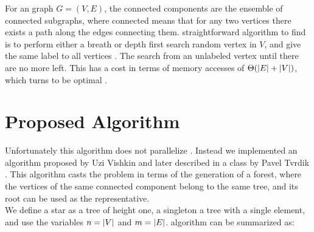 %

For an  graph $G=(V,E)$, the connected components are the ensemble
of connected subgraphs, where connected means that for any two vertices there exists a path along the edges connecting them.
 straightforward algorithm to find  is to perform either a breath or depth first search  random vertex in $V$, and give the same label to all  vertices .  The search  from an unlabeled vertex
until there are no more  left.
This has a cost in terms of memory accesses of $\Theta(\left| E \right| + \left| V \right|)$, which turns  to be optimal \cite{Hopcroft}.

\section{Proposed Algorithm}\label{sec:yourmethod}
%
%

Unfortunately this algorithm does not parallelize . Instead we  implemented
an algorithm proposed by Uzi Vishkin \cite{PCompPaper} and later described in a class by
Pavel Tvrdik \cite{PCompClass}. This algorithm casts the problem in terms of the generation of a
forest, where the vertices of the same connected component belong to the same tree, and its root
can be used as the representative.\\
We define a star as a tree of height one, a singleton  a tree with a single element, and use the variables $n=\left| V \right|$ and $m=\left| E \right|$.
 algorithm can be summarized as:

